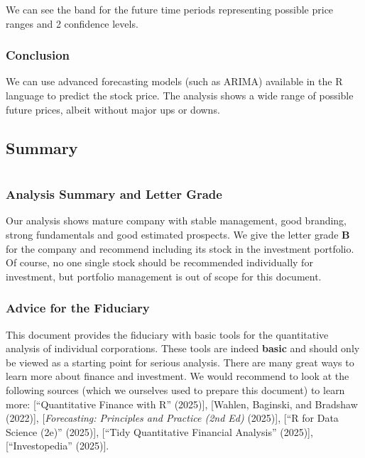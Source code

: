\documentclass[
  letterpaper,
  DIV=11,
  numbers=noendperiod]{scrartcl}
\begin{document}
We can see the band for the future time periods representing possible
price ranges and 2 confidence levels.

\subsubsection{\texorpdfstring{\textbf{Conclusion}}{Conclusion}}\label{conclusion-5}

We can use advanced forecasting models (such as ARIMA) available in the
R language to predict the stock price. The analysis shows a wide range
of possible future prices, albeit without major ups or downs.

\subsection{Summary}\label{summary}

\section{}\label{section}

\subsubsection{\texorpdfstring{\textbf{Analysis Summary and Letter
Grade}}{Analysis Summary and Letter Grade}}\label{analysis-summary-and-letter-grade}

Our analysis shows mature company with stable management, good branding,
strong fundamentals and good estimated prospects. We give the letter
grade \textbf{B} for the company and recommend including its stock in
the investment portfolio. Of course, no one single stock should be
recommended individually for investment, but portfolio management is out
of scope for this document.

\subsubsection{\texorpdfstring{\textbf{Advice for the
Fiduciary}}{Advice for the Fiduciary}}\label{advice-for-the-fiduciary}

This document provides the fiduciary with basic tools for the
quantitative analysis of individual corporations. These tools are indeed
\textbf{basic} and should only be viewed as a starting point for serious
analysis. There are many great ways to learn more about finance and
investment. We would recommend to look at the following sources (which
we ourselves used to prepare this document) to learn more:
{[}{``Quantitative Finance with {R}''} (2025){]}, {[}Wahlen, Baginski,
and Bradshaw (2022){]}, {[}\emph{Forecasting: {Principles} and
{Practice} (2nd Ed)} (2025){]}, {[}{``R for {Data Science} (2e)''}
(2025){]}, {[}{``Tidy {Quantitative Financial Analysis}''} (2025){]},
{[}{``Investopedia''} (2025){]}.
\end{document}
